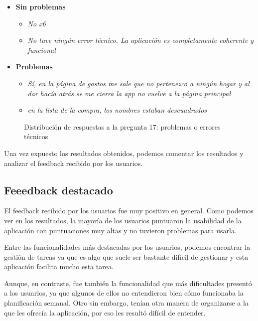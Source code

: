 \begin{itemize}
    \item \textbf{Sin problemas}
    \begin{itemize}
        \item \textit{No x6}
        \item \textit{No tuve ningún error técnico. La aplicación es completamente coherente y funcional}
    \end{itemize}
\item \textbf{Problemas}
    \begin{itemize}
        \item \textit{Sí, en la página de gastos me sale que no pertenezco a ningún hogar y al dar hacía atrás se me cierra la app no vuelve a la página principal}
        \item \textit{en la lista de la compra, los nombres estaban descuadrados}
    \end{itemize}
\end{itemize}

\begin{figure}[H]
    \centering
    \caption{Distribución de respuestas a la pregunta 17: problemas o errores técnicos}
    \label{fig:problemas-tecnicos}
\end{figure}

Una vez expuesto los resultados obtenidos, podemos comentar los resultados y analizar el feedback recibido por los usuarios.

\subsection{Feeedback destacado}

El feedback recibido por los usuarios fue muy positivo en general. Como podemos ver en los resultados, la mayoría de los 
usuarios puntuaron la usabilidad de la aplicación con puntuaciones muy altas y no tuvieron problemas para usarla.

Entre las funcionalidades más destacadas por los usuarios, podemos encontrar la gestión de tareas
ya que es algo que suele ser bastante difícil de gestionar y esta aplicación facilita mucho esta tarea.

Aunque, en contraste, fue también la funcionalidad que más dificultades presentó a los usuarios, ya que algunos de ellos no entendieron bien cómo funcionaba la planificación semanal.
Otro sin embargo, tenían otra manera de organizarse a la que les ofrecía la aplicación, por eso les resultó difícil de entender. 

